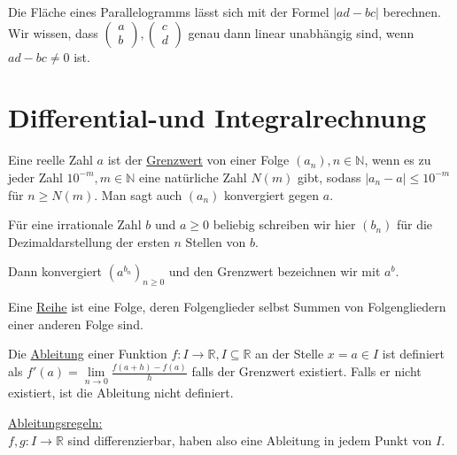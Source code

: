 \documentclass{mg2}
\begin{document}
Die Fläche eines Parallelogramms lässt sich mit der Formel $|ad-bc|$ berechnen. Wir wissen, dass $\begin{pmatrix}a\\b\end{pmatrix}, \begin{pmatrix}c\\d\end{pmatrix}$ genau dann linear unabhängig sind, wenn $ad-bc \neq 0$ ist.
\section{Differential-und Integralrechnung}

\begin{definition}[Grenzwert]
Eine reelle Zahl $a$ ist der \underline{Grenzwert} von einer Folge $(a_n), n \in \mathbb{N}$, wenn es zu jeder Zahl $10^{-m}, m \in \mathbb{N}$ eine natürliche Zahl $N(m)$ gibt, sodass $|a_n - a | \le 10^{-m}$ für $ n \ge N(m).$ Man sagt auch $(a_n)$ konvergiert gegen $a$.
\end{definition}
Für eine irrationale Zahl $b$ und $a \geq 0$ beliebig schreiben wir hier $(b_n)$  für die Dezimaldarstellung der ersten $n$ Stellen von $b$.

Dann konvergiert $(a^{b_n})_{n \geq 0}$ und den Grenzwert bezeichnen wir mit $a^b$.

\begin{definition}[Reihe]
Eine \underline{Reihe} ist eine Folge, deren Folgenglieder selbst Summen von Folgengliedern einer anderen Folge sind.
\end{definition}

\begin{definition}[Ableitung]
Die \underline{Ableitung} einer Funktion $f: I \to \mathbb{R}, I \subseteq \mathbb{R}$ an der Stelle $x = a \in I$ ist definiert als $f'(a) = \lim\limits_{n \rightarrow 0}{\frac{f(a+h)-f(a)}{h}}$ falls der Grenzwert existiert. Falls er nicht existiert, ist die Ableitung nicht definiert.
\end{definition}

\underline{Ableitungsregeln:}\\[1em]
$f,g: I \to \mathbb{R}$ sind differenzierbar, haben also eine Ableitung in jedem Punkt von $I$.
\end{document}
